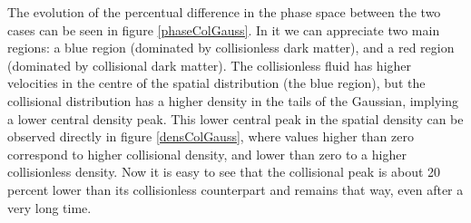 The evolution of the percentual difference in the phase space between the two cases can be seen in figure \ref{phaseColGauss}. In it we can appreciate  two main regions: a blue region (dominated by collisionless dark matter), and a red region (dominated by collisional dark matter). The collisionless fluid has higher velocities in the centre of the spatial distribution (the blue region), but the collisional distribution has a higher density in the tails of the Gaussian, implying a lower central density peak. This lower central peak in the spatial density can be observed directly in figure \ref{densColGauss}, where values higher than zero correspond to higher collisional density, and lower than zero to a higher collisionless density. Now it is easy to see that the collisional peak is about 20 percent lower than its collisionless counterpart and remains that way, even after a very long time. 


